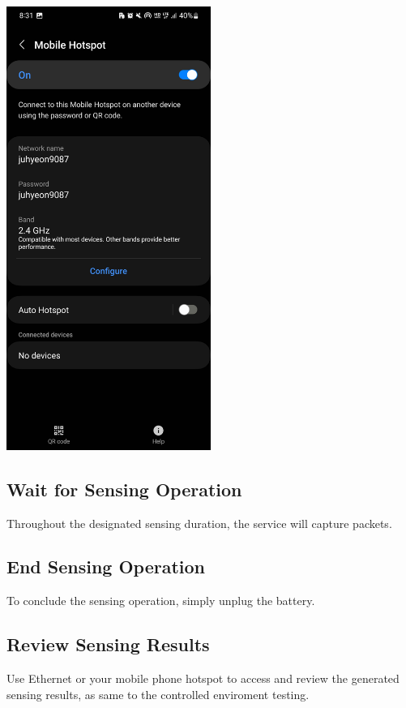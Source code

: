 \documentclass[
  letterpaper,
]{scrbook}
\begin{document}
\includegraphics[width=0.5\textwidth,height=\textheight]{content/material/ch2/check_hotspot_off.jpg}

\subsection{Wait for Sensing
Operation}\label{wait-for-sensing-operation}

Throughout the designated sensing duration, the service will capture
packets.

\subsection{End Sensing Operation}\label{end-sensing-operation}

To conclude the sensing operation, simply unplug the battery.

\subsection{Review Sensing Results}\label{review-sensing-results}

Use Ethernet or your mobile phone hotspot to access and review the
generated sensing results, as same to the controlled enviroment testing.
\end{document}
